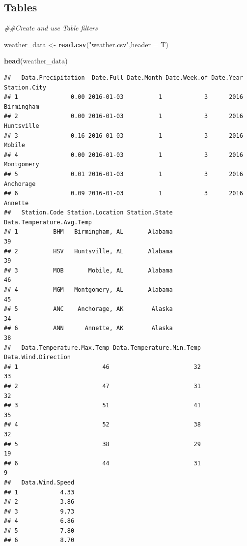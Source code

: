 \documentclass[
]{article}
\newenvironment{Shaded}{\begin{snugshade}}{\end{snugshade}}
\newcommand{\CommentTok}[1]{\textcolor[rgb]{0.56,0.35,0.01}{\textit{#1}}}
\newcommand{\DataTypeTok}[1]{\textcolor[rgb]{0.13,0.29,0.53}{#1}}
\newcommand{\KeywordTok}[1]{\textcolor[rgb]{0.13,0.29,0.53}{\textbf{#1}}}
\newcommand{\NormalTok}[1]{#1}
\newcommand{\StringTok}[1]{\textcolor[rgb]{0.31,0.60,0.02}{#1}}
\begin{document}
\hypertarget{tables}{%
\subsection{Tables}\label{tables}}

\begin{Shaded}
\begin{Highlighting}[]
\CommentTok{##Create and use Table filters }


\NormalTok{weather_data <-}\StringTok{ }\KeywordTok{read.csv}\NormalTok{(}\StringTok{"weather.csv"}\NormalTok{,}\DataTypeTok{header =}\NormalTok{ T)}

\KeywordTok{head}\NormalTok{(weather_data)}
\end{Highlighting}
\end{Shaded}

\begin{verbatim}
##   Data.Precipitation  Date.Full Date.Month Date.Week.of Date.Year Station.City
## 1               0.00 2016-01-03          1            3      2016   Birmingham
## 2               0.00 2016-01-03          1            3      2016   Huntsville
## 3               0.16 2016-01-03          1            3      2016       Mobile
## 4               0.00 2016-01-03          1            3      2016   Montgomery
## 5               0.01 2016-01-03          1            3      2016    Anchorage
## 6               0.09 2016-01-03          1            3      2016      Annette
##   Station.Code Station.Location Station.State Data.Temperature.Avg.Temp
## 1          BHM   Birmingham, AL       Alabama                        39
## 2          HSV   Huntsville, AL       Alabama                        39
## 3          MOB       Mobile, AL       Alabama                        46
## 4          MGM   Montgomery, AL       Alabama                        45
## 5          ANC    Anchorage, AK        Alaska                        34
## 6          ANN      Annette, AK        Alaska                        38
##   Data.Temperature.Max.Temp Data.Temperature.Min.Temp Data.Wind.Direction
## 1                        46                        32                  33
## 2                        47                        31                  32
## 3                        51                        41                  35
## 4                        52                        38                  32
## 5                        38                        29                  19
## 6                        44                        31                   9
##   Data.Wind.Speed
## 1            4.33
## 2            3.86
## 3            9.73
## 4            6.86
## 5            7.80
## 6            8.70
\end{verbatim}
\end{document}
